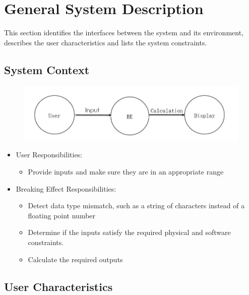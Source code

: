 \documentclass[12pt]{article}
\newcommand{\progname}{Breaking Effect} %
\begin{document}
	\section{General System Description}
	
	This section identifies the interfaces between the system and its environment,
	describes the user characteristics and lists the system constraints.
	
	\subsection{System Context}
	
	\begin{figure}
		\centering
		\includegraphics[width=0.7\linewidth]{./f18}
		\caption{}
		\label{fig:f18}
	\end{figure}
	
	\begin{itemize}
		\item User Responsibilities:
		\begin{itemize}
			\item Provide inputs and make sure they are in an appropriate range 
		\end{itemize}
		\item \progname{} Responsibilities:
		\begin{itemize}
			\item Detect data type mismatch, such as a string of characters instead of a
			floating point number
			\item Determine if the inputs satisfy the required physical and software
			constraints.​ 
			\item Calculate the required outputs
		\end{itemize}
	\end{itemize}
	
	\subsection{User Characteristics} \label{SecUserCharacteristics}
	
\end{document}
